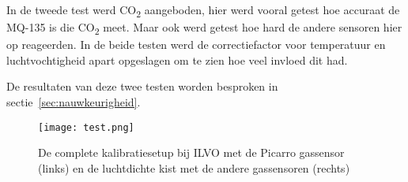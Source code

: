 In de tweede test werd CO\textsubscript{2} aangeboden, hier werd vooral getest hoe accuraat de MQ-135 is die CO\textsubscript{2} meet. Maar ook werd getest hoe hard de andere sensoren hier op reageerden. In de beide testen werd de correctiefactor voor temperatuur en luchtvochtigheid apart opgeslagen om te zien hoe veel invloed dit had.

De resultaten van deze twee testen worden besproken in sectie~\ref{sec:nauwkeurigheid}.

\begin{figure}[h]
    \texttt{[image: test.png]}
    \caption[Kalibratiesetup]{De complete kalibratiesetup bij ILVO met de Picarro gassensor (links) en de luchtdichte kist met de andere gassensoren (rechts)}
    \label{fig:test}
\end{figure}








